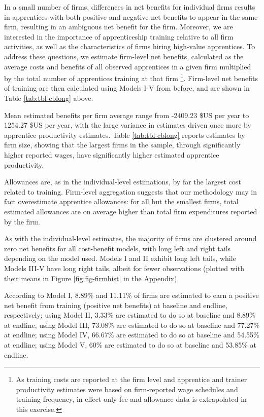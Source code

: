 \documentclass[
  11pt,
a4paper
]{article}
\begin{document}
\noindent In a small number of firms, differences in net benefits for individual firms results in apprentices with both positive and negative net benefits to appear in the same firm, resulting in an ambiguous net benefit for the firm. Moreover, we are interested in the importance of apprenticeship training relative to all firm activities, as well as the characteristics of firms hiring high-value apprentices. To address these questions, we estimate firm-level net benefits, calculated as the average costs and benefits of all observed apprentices in a given firm multiplied by the total number of apprentices training at that firm \footnote{As training costs are reported at the firm level and apprentice and trainer productivity estimates were based on firm-reported wage schedules and training frequency, in effect only fee and allowance data is extrapolated in this exercise.}. Firm-level net benefits of training are then calculated using Models I-V from before, and are shown in Table \ref{tab:tbl-cblong} above.

Mean estimated benefits per firm average range from -2409.23 \$US per year to 1254.27 \$US per year, with the large variance in estimates driven once more by apprentice productivity estimates. Table \ref{tab:tbl-cblong} reports estimates by firm size, showing that the largest firms in the sample, through significantly higher reported wages, have significantly higher estimated apprentice productivity.

Allowances are, as in the individual-level estimations, by far the largest cost related to training. Firm-level aggregation suggests that our methodology may in fact overestimate apprentice allowances: for all but the smallest firms, total estimated allowances are on average higher than total firm expenditures reported by the firm.

As with the individual-level estimates, the majority of firms are clustered around zero net benefits for all cost-benefit models, with long left and right tails depending on the model used. Models I and II exhibit long left tails, while Models III-V have long right tails, albeit for fewer observations (plotted with their means in Figure \ref{fig:fig-firmhist} in the Appendix).

According to Model I, 8.89\% and 11.11\% of firms are estimated to earn a positive net benefit from training (positive net benefits) at baseline and endline, respectively; using Model II, 3.33\% are estimated to do so at baseline and 8.89\% at endline, using Model III, 73.08\% are estimated to do so at baseline and 77.27\% at endline; using Model IV, 66.67\% are estimated to do so at baseline and 54.55\% at endline; using Model V, 60\% are estimated to do so at baseline and 53.85\% at endline.
\end{document}
